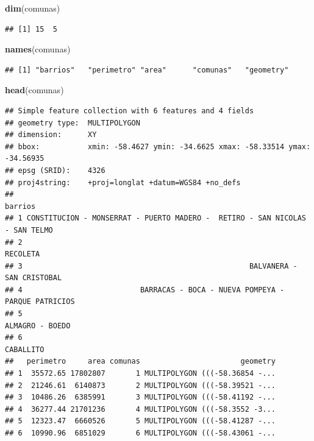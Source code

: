 \documentclass[]{book}
\newenvironment{Shaded}{\begin{snugshade}}{\end{snugshade}}
\newcommand{\KeywordTok}[1]{\textcolor[rgb]{0.13,0.29,0.53}{\textbf{#1}}}
\newcommand{\NormalTok}[1]{#1}
\begin{document}
\begin{Shaded}
\begin{Highlighting}[]
\KeywordTok{dim}\NormalTok{(comunas)}
\end{Highlighting}
\end{Shaded}

\begin{verbatim}
## [1] 15  5
\end{verbatim}

\begin{Shaded}
\begin{Highlighting}[]
\KeywordTok{names}\NormalTok{(comunas)}
\end{Highlighting}
\end{Shaded}

\begin{verbatim}
## [1] "barrios"   "perimetro" "area"      "comunas"   "geometry"
\end{verbatim}

\begin{Shaded}
\begin{Highlighting}[]
\KeywordTok{head}\NormalTok{(comunas)}
\end{Highlighting}
\end{Shaded}

\begin{verbatim}
## Simple feature collection with 6 features and 4 fields
## geometry type:  MULTIPOLYGON
## dimension:      XY
## bbox:           xmin: -58.4627 ymin: -34.6625 xmax: -58.33514 ymax: -34.56935
## epsg (SRID):    4326
## proj4string:    +proj=longlat +datum=WGS84 +no_defs
##                                                                        barrios
## 1 CONSTITUCION - MONSERRAT - PUERTO MADERO -  RETIRO - SAN NICOLAS - SAN TELMO
## 2                                                                     RECOLETA
## 3                                                    BALVANERA - SAN CRISTOBAL
## 4                           BARRACAS - BOCA - NUEVA POMPEYA - PARQUE PATRICIOS
## 5                                                              ALMAGRO - BOEDO
## 6                                                                    CABALLITO
##   perimetro     area comunas                       geometry
## 1  35572.65 17802807       1 MULTIPOLYGON (((-58.36854 -...
## 2  21246.61  6140873       2 MULTIPOLYGON (((-58.39521 -...
## 3  10486.26  6385991       3 MULTIPOLYGON (((-58.41192 -...
## 4  36277.44 21701236       4 MULTIPOLYGON (((-58.3552 -3...
## 5  12323.47  6660526       5 MULTIPOLYGON (((-58.41287 -...
## 6  10990.96  6851029       6 MULTIPOLYGON (((-58.43061 -...
\end{verbatim}
\end{document}
